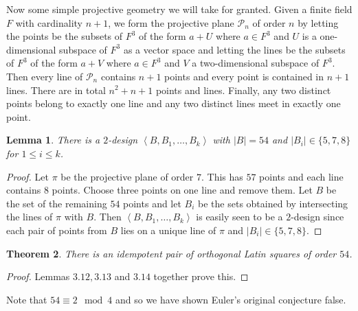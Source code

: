 \documentclass[12pt,a4paper]{article}
\newtheorem{theorem}{Theorem}[section]
\newtheorem{lemma}[theorem]{Lemma}
\newcommand\PP{\mathcal{P}}
\begin{document}
Now some simple projective geometry we will take for granted.
Given a finite field $F$ with cardinality $n+1$, we form the projective plane $\PP_n$ of order $n$ by letting the points be the subsets of $F^3$ of the form $a+U$ where $a\in F^3$ and $U$ is a one-dimensional subspace of $F^3$ as a vector space and letting the lines be the subsets of $F^3$ of the form $a+V$ where $a\in F^3$ and $V$ a two-dimensional subspace of $F^3$.
Then every line of $\PP_n$ contains $n+1$ points and every point is contained in $n+1$ lines.
There are in total $n^2+n+1$ points and lines.
Finally, any two distinct points belong to exactly one line and any two distinct lines meet in exactly one point.

\begin{lemma}
There is a $2$-design $\left<B,B_1,\ldots,B_k\right>$ with $|B|=54$ and $|B_i|\in\{5,7,8\}$ for $1\le i\le k$.
\end{lemma}
\begin{proof}
Let $\pi$ be the projective plane of order $7$.
This has $57$ points and each line contains $8$ points.
Choose three points on one line and remove them.
Let $B$ be the set of the remaining $54$ points and let $B_i$ be the sets obtained by intersecting the lines of $\pi$ with $B$.
Then $\left<B,B_1,\ldots,B_k\right>$ is easily seen to be a $2$-design since each pair of points from $B$ lies on a unique line of $\pi$ and $|B_i|\in\{5,7,8\}$.
\end{proof}

\begin{theorem}
There is an idempotent pair of orthogonal Latin squares of order $54$.
\end{theorem}
\begin{proof}
Lemmas $3.12, 3.13 $ and $3.14$ together prove this.
\end{proof}

Note that $54 \equiv 2 \mod 4$ and so we have shown Euler's original conjecture false.
\end{document}

